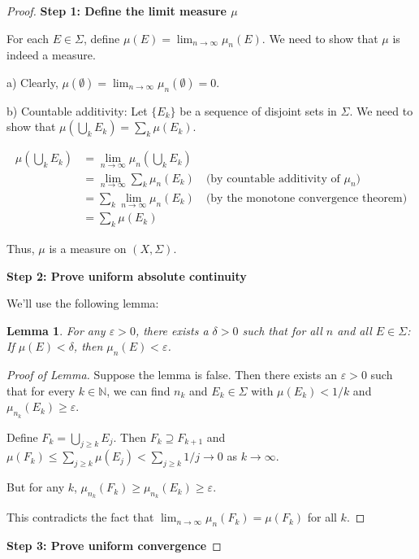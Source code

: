 \documentclass{article}
\newtheorem{lemma}[theorem]{Lemma}
\begin{document}
\begin{proof}
\textbf{Step 1: Define the limit measure $\mu$}

For each $E \in \Sigma$, define $\mu(E) = \lim_{n\to\infty} \mu_n(E)$. We need to show that $\mu$ is indeed a measure.

a) Clearly, $\mu(\emptyset) = \lim_{n\to\infty} \mu_n(\emptyset) = 0$.

b) Countable additivity: Let $\{E_k\}$ be a sequence of disjoint sets in $\Sigma$. We need to show that $\mu(\bigcup_k E_k) = \sum_k \mu(E_k)$.

   \begin{align*}
   \mu(\bigcup_k E_k) &= \lim_{n\to\infty} \mu_n(\bigcup_k E_k) \\
                      &= \lim_{n\to\infty} \sum_k \mu_n(E_k) \quad \text{(by countable additivity of $\mu_n$)} \\
                      &= \sum_k \lim_{n\to\infty} \mu_n(E_k) \quad \text{(by the monotone convergence theorem)} \\
                      &= \sum_k \mu(E_k)
   \end{align*}

Thus, $\mu$ is a measure on $(X, \Sigma)$.

\textbf{Step 2: Prove uniform absolute continuity}

We'll use the following lemma:

\begin{lemma}
For any $\varepsilon > 0$, there exists a $\delta > 0$ such that for all $n$ and all $E \in \Sigma$:
If $\mu(E) < \delta$, then $\mu_n(E) < \varepsilon$.
\end{lemma}

\begin{proof}[Proof of Lemma]
Suppose the lemma is false. Then there exists an $\varepsilon > 0$ such that for every $k \in \mathbb{N}$, we can find $n_k$ and $E_k \in \Sigma$ with $\mu(E_k) < 1/k$ and $\mu_{n_k}(E_k) \geq \varepsilon$.

Define $F_k = \bigcup_{j\geq k} E_j$. Then $F_k \supseteq F_{k+1}$ and $\mu(F_k) \leq \sum_{j\geq k} \mu(E_j) < \sum_{j\geq k} 1/j \to 0$ as $k \to \infty$.

But for any $k$, $\mu_{n_k}(F_k) \geq \mu_{n_k}(E_k) \geq \varepsilon$.

This contradicts the fact that $\lim_{n\to\infty} \mu_n(F_k) = \mu(F_k)$ for all $k$.
\end{proof}

\textbf{Step 3: Prove uniform convergence}


\end{proof}
\end{document}
